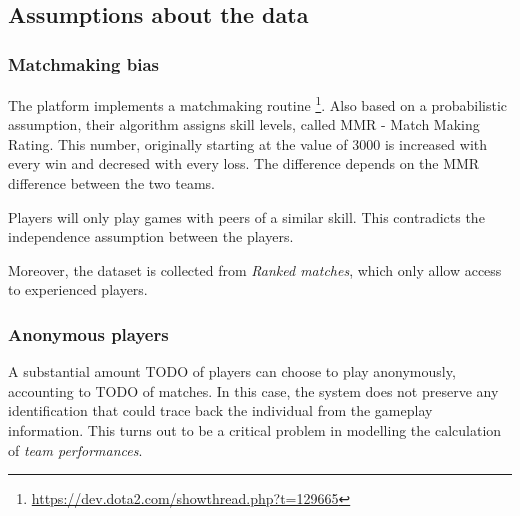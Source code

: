 \documentclass[10pt,a4]{article}
\begin{document}
\subsection{Assumptions about the data}

\subsubsection{Matchmaking bias}
The platform implements a matchmaking routine \footnote{\url{https://dev.dota2.com/showthread.php?t=129665}}.
Also based on a probabilistic assumption, their algorithm assigns skill levels,
called MMR - Match Making Rating. This number, originally starting at the value of 
3000 is increased with every win and decresed with every loss. The difference depends
on the MMR difference between the two teams. 

Players will only play games with peers of a similar skill. This contradicts the 
independence assumption between the players.  

Moreover, the dataset is collected from \emph{Ranked matches}, which only allow 
access to experienced players.

\subsubsection{Anonymous players}
A substantial amount TODO of players can choose to play anonymously, accounting to 
TODO of matches. In this case, the system does not preserve any identification that 
could trace back the individual from the gameplay information. This turns out 
to be a critical problem in modelling the calculation of \emph{team performances}.


















 
\newpage

\end{document}

